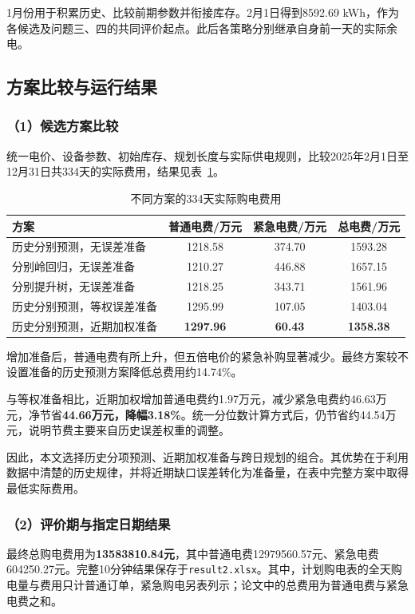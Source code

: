 1月份用于积累历史、比较前期参数并衔接库存。2月1日得到8592.69 kWh，作为各候选及问题三、四的共同评价起点。此后各策略分别继承自身前一天的实际余电。

\subsection{方案比较与运行结果}
\subsubsection*{（1）候选方案比较}
统一电价、设备参数、初始库存、规划长度与实际供电规则，比较2025年2月1日至12月31日共334天的实际费用，结果见表~\ref{tab:q2_model_compare}。
\begin{table}[!htbp]
\centering
\caption{不同方案的334天实际购电费用}
\label{tab:q2_model_compare}
\begin{tabular}{lccc}
\hline
方案 & 普通电费/万元 & 紧急电费/万元 & 总电费/万元 \\
\hline
历史分别预测，无误差准备
& 1218.58 & 374.70 & 1593.28 \\
分别岭回归，无误差准备
& 1210.27 & 446.88 & 1657.15 \\
分别提升树，无误差准备
& 1218.25 & 343.71 & 1561.96 \\
历史分别预测，等权误差准备
& 1295.99 & 107.05 & 1403.04 \\
历史分别预测，近期加权准备
& \textbf{1297.96} & \textbf{60.43} & \textbf{1358.38} \\
\hline
\end{tabular}
\end{table}
增加准备后，普通电费有所上升，但五倍电价的紧急补购显著减少。最终方案较不设置准备的历史预测方案降低总费用约14.74\%。

与等权准备相比，近期加权增加普通电费约1.97万元，减少紧急电费约46.63万元，净节省\textbf{44.66万元，降幅3.18\%}。统一分位数计算方式后，仍节省约44.54万元，说明节费主要来自历史误差权重的调整。

因此，本文选择历史分项预测、近期加权准备与跨日规划的组合。其优势在于利用数据中清楚的历史规律，并将近期缺口误差转化为准备量，在表中完整方案中取得最低实际费用。

\subsubsection*{（2）评价期与指定日期结果}
最终总购电费用为\textbf{13583810.84元}，其中普通电费12979560.57元、紧急电费604250.27元。完整10分钟结果保存于\texttt{result2.xlsx}。其中，计划购电表的全天购电量与费用只计普通订单，紧急购电另表列示；论文中的总费用为普通电费与紧急电费之和。

